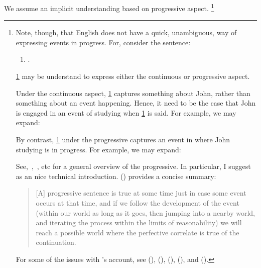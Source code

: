 \begin{note}
  \noindent%
  We assume an implicit understanding based on progressive aspect.%
  \footnote{
    \nocite{Portner:1998um}
    \nocite{Engelberg:1999vi}
    Note, though, that English does not have a quick, unambiguous, way of expressing events in progress.
    For, consider the sentence:
    \begin{enumerate}[label=\arabic*., ref=(\arabic*)]
    \item
      \label{prog:abmig}
      .
    \end{enumerate}
    \ref{prog:abmig} may be understand to express either the continuous or progressive aspect.

    Under the continuous aspect, \ref{prog:abmig} captures something about John, rather than something about an event happening.
    Hence, it need to be the case that John is engaged in an event of studying when \ref{prog:abmig} is said.
    For example, we may expand:

    By contrast, \ref{prog:abmig} under the progressive captures an event in where John studying is in progress.
    For example, we may expand:

    See,~\textcite{Richards:1981wo},~\textcite{Portner:2011vi}, etc for a general overview of the progressive.
    In particular, I suggest \textcite{Landman:1992wh} as an nice technical introduction.
    \citeauthor{Szabo:2004ul} (\citeyear[34]{Szabo:2004ul}) provides a concise summary:
    \begin{quote}
      [A] progressive sentence is true at some time just in case some event occurs at that time, and if we follow the development of the event (within our world as long as it goes, then jumping into a nearby world, and iterating the process within the limits of reasonability) we will reach a possible world where the perfective correlate is true of the continuation.
    \end{quote}
    For some of the issues with \citeauthor{Landman:1992wh}'s account, see
    (\cite{Bonomi:1997uq}),
    (\cite[49--50]{Engelberg:1999vi}),
    (\cite[35]{Szabo:2004ul}),
    (\cite[767]{Portner:1998um}),
    and (\cite[1256]{Portner:2011vi}).
  }
\end{note}


